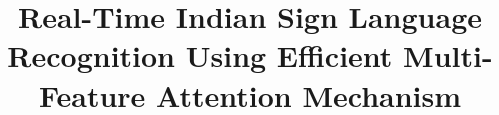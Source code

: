 \documentclass[a4paper]{authesis}
\title{Real-Time Indian Sign Language Recognition Using Efficient Multi-Feature Attention Mechanism}
\author{
	\student{Rajesh A}{2023103046}
	\student{Kathir Kalidass B}{2023103546}
	\student{Sathyanarayanan P}{2023103579}
	\student{Nandha S}{2023103703}
}
\begin{document}
	\hypersetup{pageanchor=false}
	\authesisfrontmatter %

	\aumakecover
	\aumakecertificate
	\aumakeacknowledgement
	
	\autableofcontents
	\aulistoftables
	\aulistoffigures
	
	

	\authesischapters %
	\hypersetup{pageanchor=true}
	\nocite{yenisari2025deep,joshi2024isign,pandey2025realtime,geetha2025toward,lecun2015deep,kumar2024survey,li2024multimodal,zhou2024transformer,camgoz2018neural,kezar2023semlex,alqurishi2021deep,alabdullah2024advancements,joze2019msasl}
	
	
	
	
	
	
	
\end{document}
